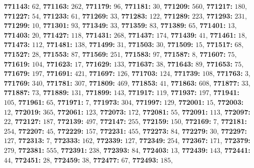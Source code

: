 \textsf{\bfseries 771143:} $62$, \textsf{\bfseries 771163:} $262$, \textsf{\bfseries 771179:} $96$, \textsf{\bfseries 771181:} $30$, \textsf{\bfseries 771209:} $560$, \textsf{\bfseries 771217:} $180$, \textsf{\bfseries 771227:} $54$, \textsf{\bfseries 771233:} $61$, \textsf{\bfseries 771269:} $33$, \textsf{\bfseries 771283:} $122$, \textsf{\bfseries 771289:} $223$, \textsf{\bfseries 771293:} $231$, \textsf{\bfseries 771299:} $10$, \textsf{\bfseries 771301:} $93$, \textsf{\bfseries 771349:} $33$, \textsf{\bfseries 771359:} $83$, \textsf{\bfseries 771389:} $65$, \textsf{\bfseries 771401:} $13$, \textsf{\bfseries 771403:} $20$, \textsf{\bfseries 771427:} $118$, \textsf{\bfseries 771431:} $268$, \textsf{\bfseries 771437:} $174$, \textsf{\bfseries 771439:} $41$, \textsf{\bfseries 771461:} $18$, \textsf{\bfseries 771473:} $112$, \textsf{\bfseries 771481:} $138$, \textsf{\bfseries 771499:} $31$, \textsf{\bfseries 771503:} $30$, \textsf{\bfseries 771509:} $15$, \textsf{\bfseries 771517:} $68$, \textsf{\bfseries 771527:} $28$, \textsf{\bfseries 771553:} $87$, \textsf{\bfseries 771569:} $251$, \textsf{\bfseries 771583:} $97$, \textsf{\bfseries 771587:} $8$, \textsf{\bfseries 771607:} $75$, \textsf{\bfseries 771619:} $104$, \textsf{\bfseries 771623:} $17$, \textsf{\bfseries 771629:} $133$, \textsf{\bfseries 771637:} $38$, \textsf{\bfseries 771643:} $89$, \textsf{\bfseries 771653:} $75$, \textsf{\bfseries 771679:} $197$, \textsf{\bfseries 771691:} $421$, \textsf{\bfseries 771697:} $126$, \textsf{\bfseries 771703:} $124$, \textsf{\bfseries 771739:} $108$, \textsf{\bfseries 771763:} $3$, \textsf{\bfseries 771769:} $340$, \textsf{\bfseries 771781:} $307$, \textsf{\bfseries 771809:} $469$, \textsf{\bfseries 771853:} $41$, \textsf{\bfseries 771863:} $608$, \textsf{\bfseries 771877:} $33$, \textsf{\bfseries 771887:} $73$, \textsf{\bfseries 771889:} $131$, \textsf{\bfseries 771899:} $143$, \textsf{\bfseries 771917:} $119$, \textsf{\bfseries 771937:} $197$, \textsf{\bfseries 771941:} $105$, \textsf{\bfseries 771961:} $65$, \textsf{\bfseries 771971:} $7$, \textsf{\bfseries 771973:} $304$, \textsf{\bfseries 771997:} $129$, \textsf{\bfseries 772001:} $15$, \textsf{\bfseries 772003:} $12$, \textsf{\bfseries 772019:} $365$, \textsf{\bfseries 772061:} $123$, \textsf{\bfseries 772073:} $172$, \textsf{\bfseries 772081:} $55$, \textsf{\bfseries 772091:} $113$, \textsf{\bfseries 772097:} $22$, \textsf{\bfseries 772127:} $187$, \textsf{\bfseries 772139:} $497$, \textsf{\bfseries 772147:} $255$, \textsf{\bfseries 772159:} $150$, \textsf{\bfseries 772169:} $7$, \textsf{\bfseries 772181:} $254$, \textsf{\bfseries 772207:} $45$, \textsf{\bfseries 772229:} $157$, \textsf{\bfseries 772231:} $455$, \textsf{\bfseries 772273:} $84$, \textsf{\bfseries 772279:} $30$, \textsf{\bfseries 772297:} $127$, \textsf{\bfseries 772313:} $7$, \textsf{\bfseries 772333:} $162$, \textsf{\bfseries 772339:} $127$, \textsf{\bfseries 772349:} $254$, \textsf{\bfseries 772367:} $171$, \textsf{\bfseries 772379:} $279$, \textsf{\bfseries 772381:} $555$, \textsf{\bfseries 772391:} $238$, \textsf{\bfseries 772393:} $84$, \textsf{\bfseries 772403:} $13$, \textsf{\bfseries 772439:} $143$, \textsf{\bfseries 772441:} $44$, \textsf{\bfseries 772451:} $28$, \textsf{\bfseries 772459:} $38$, \textsf{\bfseries 772477:} $67$, \textsf{\bfseries 772493:} $185$, 
